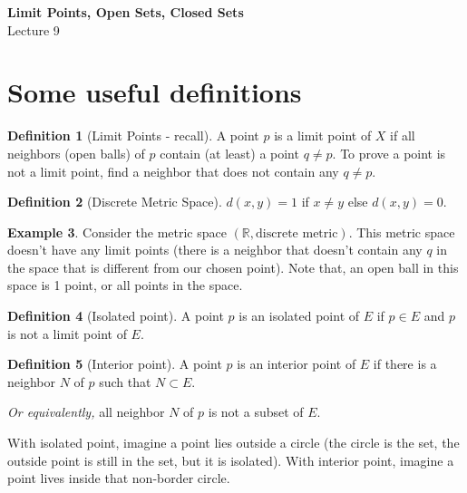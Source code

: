 \documentclass[12pt]{article}
\newcommand{\RR}{\mathbb{R}}   %
\theoremstyle{definition}
\newtheorem{definition}{Definition}[section]
\newtheorem{example}[definition]{Example}
\theoremstyle{plain}
\begin{document}

\begin{center}
    {\Large \textbf{Limit Points, Open Sets, Closed Sets}}\\[0.5em]
    {\large Lecture 9}
\end{center}

\tableofcontents

\newpage

\section{Some useful definitions}
\begin{definition}[Limit Points - recall]
A point $p$ is a limit point of $X$ if all neighbors (open balls) of $p$ contain (at least) a point $q\neq p$. To prove a point is not a limit point, find a neighbor that does not contain any $q \neq p$.
\end{definition}  

\begin{definition}[Discrete Metric Space]
$d(x,y)=1$ if $x\neq y$ else $d(x,y)=0$. 
\end{definition}

\begin{example}
Consider the metric space $(\RR, \text{discrete metric})$. This metric space doesn't have any limit points (there is a neighbor that doesn't contain any $q$ in the space that is different from our chosen point). Note that, an open ball in this space is 1 point, or all points in the space.
\end{example}

\begin{definition}[Isolated point]
A point $p$ is an isolated point of $E$ if $p \in E$ and $p$ is not a limit point of $E$.
\end{definition}

\begin{definition}[Interior point]
A point $p$ is an interior point of $E$ if there is a neighbor $N$ of $p$ such that $N \subset E$.

\textit{Or equivalently,} all neighbor $N$ of $p$ is not a subset of $E$.
\end{definition}

\begin{note}
With isolated point, imagine a point lies outside a circle (the circle is the set, the outside point is still in the set, but it is isolated). With interior point, imagine a point lives inside that non-border circle.
\end{note}
\end{document}
